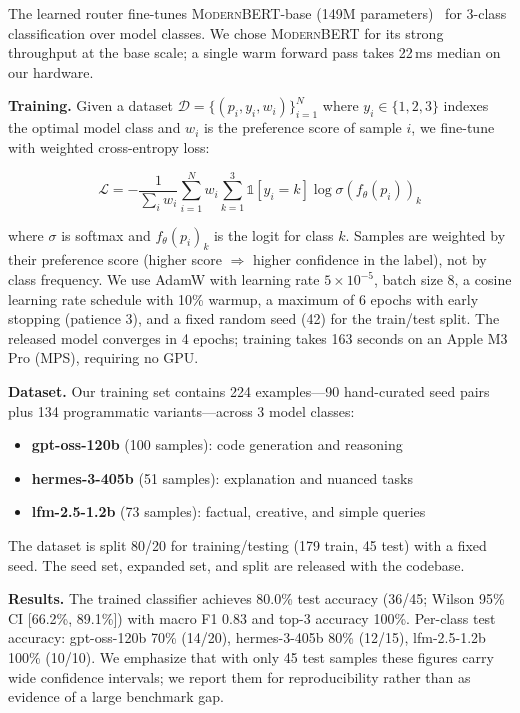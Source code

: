 \documentclass[11pt,a4paper]{article}
\newcommand{\modernbert}{\textsc{ModernBERT}}
\newcommand{\dataset}{\mathcal{D}}
\newcommand{\loss}{\mathcal{L}}
\begin{document}
The learned router fine-tunes \modernbert{}-base (149M parameters)~\cite{modernbert2025} for 3-class classification over model classes.
We chose \modernbert{} for its strong throughput at the base scale; a single warm forward pass takes 22\,ms median on our hardware.

\textbf{Training.}
Given a dataset $\dataset = \{(p_i, y_i, w_i)\}_{i=1}^N$ where $y_i \in \{1,2,3\}$ indexes the optimal model class and $w_i$ is the preference score of sample $i$, we fine-tune with weighted cross-entropy loss:

\begin{equation}
    \loss = -\frac{1}{\sum_i w_i} \sum_{i=1}^N w_i \sum_{k=1}^3 \mathbb{1}[y_i = k] \log \sigma(f_\theta(p_i))_k
    \label{eq:ce}
\end{equation}

where $\sigma$ is softmax and $f_\theta(p_i)_k$ is the logit for class $k$.
Samples are weighted by their preference score (higher score $\Rightarrow$ higher confidence in the label), not by class frequency.
We use AdamW with learning rate $5\times10^{-5}$, batch size 8, a cosine learning rate schedule with 10\% warmup, a maximum of 6 epochs with early stopping (patience 3), and a fixed random seed (42) for the train/test split.
The released model converges in 4 epochs; training takes 163 seconds on an Apple M3 Pro (MPS), requiring no GPU.

\textbf{Dataset.}
Our training set contains 224 examples---90 hand-curated seed pairs plus 134 programmatic variants---across 3 model classes:
\begin{itemize}[leftmargin=*]
    \item \textbf{gpt-oss-120b} (100 samples): code generation and reasoning
    \item \textbf{hermes-3-405b} (51 samples): explanation and nuanced tasks
    \item \textbf{lfm-2.5-1.2b} (73 samples): factual, creative, and simple queries
\end{itemize}

The dataset is split 80/20 for training/testing (179 train, 45 test) with a fixed seed.
The seed set, expanded set, and split are released with the codebase.

\textbf{Results.}
The trained classifier achieves 80.0\% test accuracy (36/45; Wilson 95\% CI [66.2\%, 89.1\%]) with macro F1 0.83 and top-3 accuracy 100\%.
Per-class test accuracy: gpt-oss-120b 70\% (14/20), hermes-3-405b 80\% (12/15), lfm-2.5-1.2b 100\% (10/10).
We emphasize that with only 45 test samples these figures carry wide confidence intervals; we report them for reproducibility rather than as evidence of a large benchmark gap.
\end{document}
